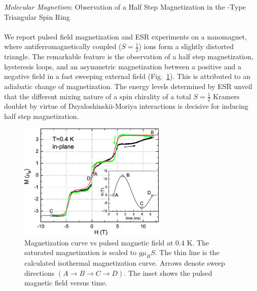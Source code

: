 {\sl Molecular Magnetism}: Observation of a Half Step Magnetization
in the -Type Triangular Spin Ring\\
\\
We report pulsed field magnetization and ESR experiments on a 
nanomagnet, where antiferromagnetically coupled  ($S = \frac{1}{2}$) ions
form a slightly distorted triangle. The remarkable feature is the observation of a half
step magnetization, hysteresis loops, and an asymmetric magnetization between a positive
and a negative field in a fast sweeping external field (Fig.~\ref{kortzfig2}). This is
attributed to an adiabatic change of magnetization. The energy levels determined by ESR
unveil that the different mixing nature of a spin chirality of a total $S = \frac{1}{2}$
Kramers doublet by virtue of Dzyaloshinskii-Moriya interactions is decisive for inducing
half step magnetization.

\begin{figure}[ht]
\begin{center}
\includegraphics[width=7cm]{Kortz/kortzfig2}
\caption{Magnetization curve vs pulsed magnetic field at 0.4 K.  The saturated
  magnetization is scaled to $g \mu_BS$. The thin line is the calculated isothermal
  magnetization curve. Arrows denote sweep directions $(A \rightarrow B \rightarrow C
  \rightarrow D)$. The inset shows the pulsed magnetic field versus time.}
\label{kortzfig2}
\end{center}
\end{figure}


